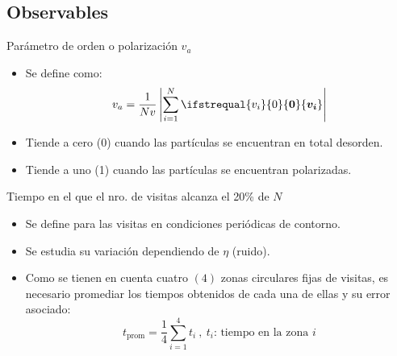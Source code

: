 \documentclass{beamer}
\renewcommand\vec[1]{\ifstrequal{#1}{0}{\ensuremath{\mathbf{0}}}{\ensuremath{\boldsymbol{#1}}}}
\begin{document}
        \subsection{Observables}

            \begin{frame}{Parámetro de orden o polarización $v_a$}
                \begin{itemize}
                    \item Se define como:
                    \begin{equation}
                        v_a = \frac{1}{Nv} \left|\sum_{i=1}^{N} \vec{v_i} \right|
                    \end{equation}
                    \item Tiende a cero (0) cuando las partículas se encuentran en total desorden.
                    \item Tiende a uno (1) cuando las partículas se encuentran polarizadas.
                \end{itemize}
            \end{frame}

            \begin{frame}{Tiempo en el que el nro. de visitas alcanza el 20\% de $N$ }
                \begin{itemize}
                    \item Se define para las visitas en condiciones periódicas de contorno.
                    \item Se estudia su variación dependiendo de $\eta$ (ruido).
                    \item Como se tienen en cuenta cuatro $(4)$ zonas circulares fijas de visitas, es necesario promediar
                    los tiempos obtenidos de cada una de ellas y su error asociado:
                    \begin{equation}
                        t_{\text{prom}} = \frac{1}{4} \sum_{i=1}^{4} t_i \ ,\ t_i\text{: tiempo en la zona }i
                    \end{equation}
                \end{itemize}
            \end{frame}
\end{document}

